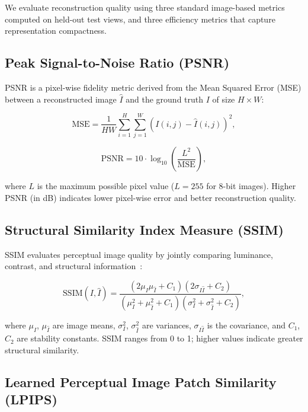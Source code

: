 We evaluate reconstruction quality using three standard image-based metrics computed on held-out test views, and three efficiency metrics that capture representation compactness.

\subsection{Peak Signal-to-Noise Ratio (PSNR)}

PSNR is a pixel-wise fidelity metric derived from the Mean Squared Error (MSE) between a reconstructed image $\hat{I}$ and the ground truth $I$ of size $H \times W$:

\begin{equation}
\mathrm{MSE} = \frac{1}{HW} \sum_{i=1}^{H} \sum_{j=1}^{W} \left( I(i,j) - \hat{I}(i,j) \right)^2,
\end{equation}

\begin{equation}
\mathrm{PSNR} = 10 \cdot \log_{10} \left( \frac{L^2}{\mathrm{MSE}} \right),
\end{equation}

where $L$ is the maximum possible pixel value ($L = 255$ for 8-bit images). Higher PSNR (in dB) indicates lower pixel-wise error and better reconstruction quality.

\subsection{Structural Similarity Index Measure (SSIM)}

SSIM evaluates perceptual image quality by jointly comparing luminance, contrast, and structural information~\cite{wang2004ssim}:

\begin{equation}
\mathrm{SSIM}(I, \hat{I}) =
\frac{(2 \mu_I \mu_{\hat{I}} + C_1)(2 \sigma_{I\hat{I}} + C_2)}
{(\mu_I^2 + \mu_{\hat{I}}^2 + C_1)(\sigma_I^2 + \sigma_{\hat{I}}^2 + C_2)},
\end{equation}

where $\mu_I$, $\mu_{\hat{I}}$ are image means, $\sigma_I^2$, $\sigma_{\hat{I}}^2$ are variances, $\sigma_{I\hat{I}}$ is the covariance, and $C_1$, $C_2$ are stability constants. SSIM ranges from 0 to 1; higher values indicate greater structural similarity.

\subsection{Learned Perceptual Image Patch Similarity (LPIPS)}

